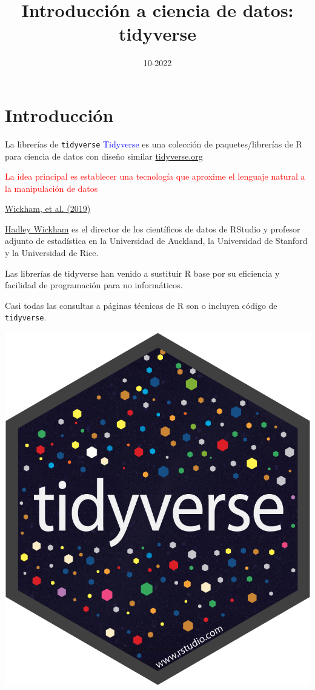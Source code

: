 \documentclass[
  ignorenonframetext,
  aspectratio=169]{beamer}
\title{Introducción a ciencia de datos: tidyverse}
\author{}
\date{\vspace{-2.5em}10-2022}
\newcommand\blue[1]{\textcolor{blue}{#1}}
\newcommand\red[1]{\textcolor{red}{#1}}
\begin{document}
\frame{\titlepage}

\begin{frame}[allowframebreaks]
  \tableofcontents[hideallsubsections]
\end{frame}
\section{Introducción}\label{introducciuxf3n}

\begin{frame}[fragile]{La librerías de \texttt{tidyverse}}
\label{la-libreruxedas-de-tidyverse}
\blue{Tidyverse} es una colección de paquetes/librerías de R para
ciencia de datos con diseño similar
\href{https://www.tidyverse.org/}{tidyverse.org}

\red{ La idea principal es establecer una tecnología que aproxime el lenguaje natural a la manipulación de datos}

\href{https://joss.theoj.org/papers/10.21105/joss.01686}{Wickham, et al.
(2019)}

\href{https://hadley.nz/}{Hadley Wickham} es el director de los
científicos de datos de RStudio y profesor adjunto de estadística en la
Universidad de Auckland, la Universidad de Stanford y la Universidad de
Rice.

Las librerías de tidyverse han venido a sustituir R base por su
eficiencia y facilidad de programación para no informáticos.

Casi todas las consultas a páginas técnicas de R son o incluyen código
de \texttt{tidyverse}.

\begin{flushright}\includegraphics[width=0.1\linewidth]{Imgs/hex-tidyverse} \end{flushright}
\end{frame}
\end{document}
